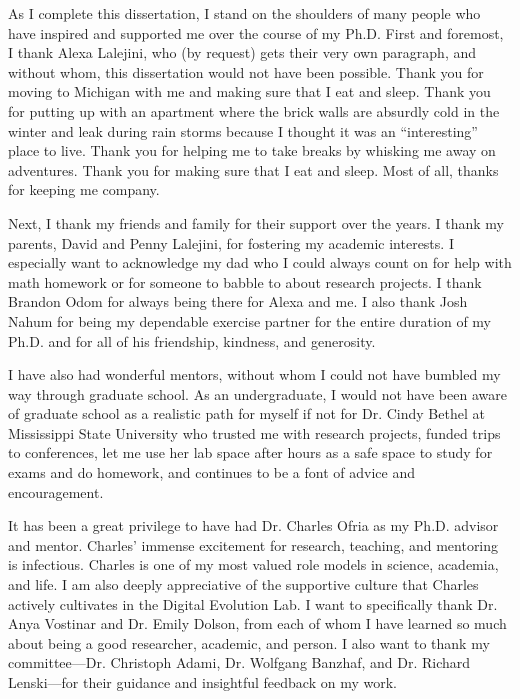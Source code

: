 
As I complete this dissertation, I stand on the shoulders of many people who have inspired and supported me over the course of my Ph.D.
First and foremost, I thank Alexa Lalejini, who (by request) gets their very own paragraph, and without whom, this dissertation would not have been possible. 
Thank you for moving to Michigan with me and making sure that I eat and sleep. 
Thank you for putting up with an apartment where the brick walls are absurdly cold in the winter and leak during rain storms because I thought it was an ``interesting'' place to live.
Thank you for helping me to take breaks by whisking me away on adventures. %
Thank you for making sure that I eat and sleep.
Most of all, thanks for keeping me company. 

Next, I thank my friends and family for their support over the years. 
I thank my parents, David and Penny Lalejini, for fostering my academic interests. %
I especially want to acknowledge my dad who I could always count on for help with math homework or for someone to babble to about research projects.
I thank Brandon Odom for always being there for Alexa and me.
I also thank Josh Nahum for being my dependable exercise partner for the entire duration of my Ph.D. and for all of his friendship, kindness, and generosity. 

I have also had wonderful mentors, without whom I could not have bumbled my way through graduate school. %
As an undergraduate, I would not have been aware of graduate school as a realistic path for myself if not for Dr. Cindy Bethel at Mississippi State University who trusted me with research projects, funded trips to conferences, let me use her lab space after hours as a safe space to study for exams and do homework, and continues to be a font of advice and encouragement.

It has been a great privilege to have had Dr. Charles Ofria as my Ph.D. advisor and mentor.
Charles' immense excitement for research, teaching, and mentoring is infectious. 
Charles is one of my most valued role models in science, academia, and life.
I am also deeply appreciative of the supportive culture that Charles actively cultivates in the Digital Evolution Lab.
I want to specifically thank Dr. Anya Vostinar and Dr. Emily Dolson,
from each of whom I have learned so much about being a good researcher, academic, and person.
I also want to thank my committee---Dr. Christoph Adami, Dr. Wolfgang Banzhaf, and Dr. Richard Lenski---for their guidance and insightful feedback on my work. 

